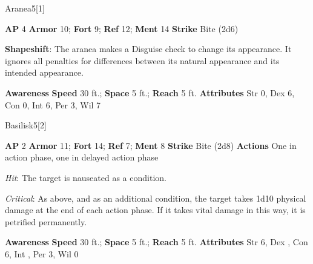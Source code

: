 \begin{monsection}{Aranea}{5}[1]
\vspace{-1em}\vspace{-1em}
\begin{spellcontent}
\begin{spelltargetinginfo}
{\textbf{AP} 4}
\pari \textbf{Armor} 10;
\textbf{Fort} 9;
\textbf{Ref} 12;
\textbf{Ment} 14
\pari \textbf{Strike} Bite  (2d6)
\end{spelltargetinginfo}
\begin{spelleffects}
\pari
\textbf{Shapeshift}:
The aranea makes a Disguise check to change its appearance.
It ignores all penalties for differences between its natural appearance and its intended appearance.
\end{spelleffects}
\end{spellcontent}
\begin{spellsubcontent}
\begin{spellfooter}
\pari \textbf{Awareness} 
\pari \textbf{Speed} 30 ft.;
\textbf{Space} 5 ft.;
\textbf{Reach} 5 ft.
\pari \textbf{Attributes}
Str 0,
Dex 6,
Con 0,
Int 6,
Per 3,
Wil 7
\end{spellfooter}
\end{spellsubcontent}
\end{monsection}
\begin{monsection}{Basilisk}{5}[2]
\vspace{-1em}\vspace{-1em}
\begin{spellcontent}
\begin{spelltargetinginfo}
{\textbf{AP} 2}
\pari \textbf{Armor} 11;
\textbf{Fort} 14;
\textbf{Ref} 7;
\textbf{Ment} 8
\pari \textbf{Strike} Bite  (2d8)
\pari \textbf{Actions} One in action phase, one in delayed action phase
\end{spelltargetinginfo}
\begin{spelleffects}
\pari
{}
\par
\par \textit{Hit}: The target is nauseated as a condition.
\par \textit{Critical}:
As above, and as an additional condition, the target takes 1d10 physical damage at the end of each action phase.
If it takes vital damage in this way, it is petrified permanently.
\end{spelleffects}
\end{spellcontent}
\begin{spellsubcontent}
\begin{spellfooter}
\pari \textbf{Awareness} 
\pari \textbf{Speed} 30 ft.;
\textbf{Space} 5 ft.;
\textbf{Reach} 5 ft.
\pari \textbf{Attributes}
Str 6,
Dex ,
Con 6,
Int ,
Per 3,
Wil 0
\end{spellfooter}
\end{spellsubcontent}
\end{monsection}
